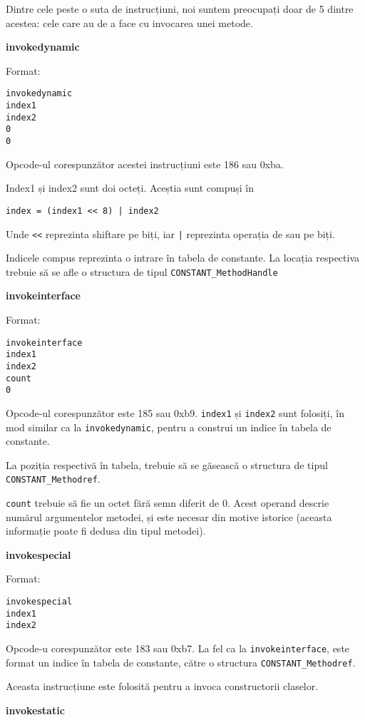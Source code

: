 Dintre cele peste o suta de instrucțiuni, noi suntem preocupați doar de
5 dintre acestea: cele care au de a face cu invocarea unei metode.

\textbf{invokedynamic}

Format:
\begin{verbatim}
invokedynamic
index1
index2
0
0
\end{verbatim}

Opcode-ul corespunzător acestei instrucțiuni este 186 sau
0xba.

Index1 și index2 sunt doi octeți. Aceștia sunt compuși în
\begin{lstlisting}
index = (index1 << 8) | index2
\end{lstlisting}
Unde \texttt{<<} reprezinta shiftare pe biți, iar \texttt{|}
reprezinta operația de sau pe biți.

Indicele compus reprezinta o intrare în tabela de constante. La locația
respectiva trebuie să se afle o structura de tipul
\texttt{CONSTANT\_MethodHandle}

\textbf{invokeinterface}

Format:
\begin{verbatim}
invokeinterface
index1
index2
count
0
\end{verbatim}

Opcode-ul corespunzător este 185 sau 0xb9.
\texttt{index1} și \texttt{index2} sunt folosiți, în mod similar ca la
\texttt{invokedynamic}, pentru a construi un indice în tabela
de constante.

La poziția respectivă în tabela, trebuie să se găsească o structura de
tipul \texttt{CONSTANT\_Methodref}.

\texttt{count} trebuie să fie un octet fără semn diferit de 0. Acest
operand descrie numărul argumentelor metodei, și este necesar din motive
istorice (aceasta informație poate fi dedusa din tipul metodei).

\textbf{invokespecial}

Format:
\begin{verbatim}
invokespecial
index1
index2
\end{verbatim}

Opcode-u corespunzător este 183 sau 0xb7. La fel ca la
\texttt{invokeinterface}, este format un indice în tabela de constante,
către o structura \texttt{CONSTANT\_Methodref}.

Aceasta instrucțiune este folosită pentru a invoca constructorii
claselor.

\textbf{invokestatic}

